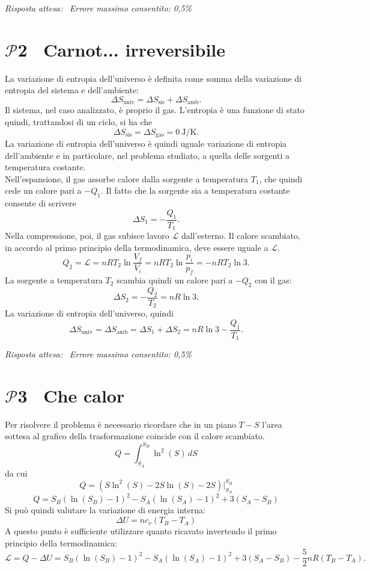 \documentclass[a4paper,12pt]{article}
\newcommand{\problemtitle}[1]{
  \noindent
  \textbf{\Large #1}\hspace{0.5em}
  \raisebox{0.6ex}{\rule{\linewidth - \widthof{\textbf{\Large #1}} - 0.6em}{0.4pt}}%
}
\begin{document}
\textit{Risposta attesa:}  \, \textit{Errore massimo consentito: 0,5\%}


\section*{\problemtitle{$\mathcal{P}${\small{2}} \ Carnot... irreversibile}}
La variazione di entropia dell'universo è definita come somma della variazione di entropia del sistema e dell'ambiente:
\[
\Delta S_{\text{univ}} = \Delta S_{\text{sis}} + \Delta S_{\text{amb}}. \tag{2.0}
\]
Il sistema, nel caso analizzato, è proprio il gas. L'entropia è una funzione di stato quindi, trattandosi di un ciclo, si ha che 
\[
\Delta S_{\text{sis}} = \Delta S_{\text{gas}} = \SI{0}{\joule\per\kelvin}. \tag{2.1}
\]
La variazione di entropia dell'universo è quindi uguale variazione di entropia dell'ambiente e in particolare, nel problema studiato, a quella delle sorgenti a temperatura costante. \\
Nell'espansione, il gas assorbe calore dalla sorgente a temperatura $T_1$, che quindi cede un calore pari a $-Q_1$. Il fatto che la sorgente sia a temperatura costante consente di scrivere
\[
\Delta S_1 = -\frac{Q_1}{T_1}. \tag{2.2}
\]
Nella compressione, poi, il gas subisce lavoro $\mathcal{L}$ dall'esterno. Il calore scambiato, in accordo al primo principio della termodinamica, deve essere uguale a $\mathcal{L}$.
\[
Q_2 = \mathcal{L} = nRT_2\ln{\frac{V_f}{V_i}} = nRT_2\ln{\frac{p_i}{p_f}} = -nRT_2\ln{3}. \tag{2.3}
\]
La sorgente a temperatura $T_2$ scambia quindi un calore pari a $-Q_2$ con il gas:
\[
\Delta S_2 = -\frac{Q_2}{T_2} = nR\ln{3}. \tag{2.4}
\]
La variazione di entropia dell'universo, quindi
\[
\Delta S_{\text{univ}} = \Delta S_{\text{amb}} = \Delta S_1 + \Delta S_2 = nR\ln{3} - \frac{Q_1}{T_1}. \tag{2.5}
\]

\textit{Risposta attesa:}  \, \textit{Errore massimo consentito: 0,5\%}


\section*{\problemtitle{$\mathcal{P}${\small{3}} \ Che calor}}
Per risolvere il problema è necessario ricordare che in un piano $T-S$ l'area sottesa al grafico della trasformazione coincide con il calore scambiato.
\[
Q = \int^{S_B}_{S_A}\ln^2({S})\,dS \tag{3.0}
\]
da cui 
\[
Q = (S \ln^2(S)-2S \ln(S)-2S)|^{S_B}_{S_A} \tag{3.1}
\]
\[
Q = S_B(\ln(S_B)-1)^2 - S_A(\ln(S_A)-1)^2+3(S_A-S_B) \tag{3.2}
\]
Si può quindi valutare la variazione di energia interna:
\[
\Delta U = nc_v(T_B-T_A) \tag{3.3}
\]
A questo punto è sufficiente utilizzare quanto ricavato invertendo il primo principio della termodinamica:
\[
\mathcal{L} = Q- \Delta U = S_B(\ln(S_B)-1)^2 - S_A(\ln(S_A)-1)^2+3(S_A-S_B) - \frac{5}{2}nR(T_B-T_A). \tag{3.4}
\]
\end{document}

